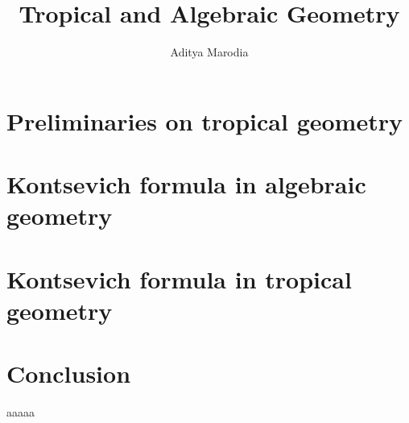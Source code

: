 \documentclass{iiser-thesis}
\title{Tropical and Algebraic Geometry}
\author{Aditya Marodia}
\theoremstyle{definition}
\theoremstyle{plain}
\begin{document}
\thesisfront


\chapter{Preliminaries on tropical geometry}
\label{chap:sturmfels}


%

\chapter{Kontsevich formula in algebraic geometry}
\label{chap:kontalggeom}


\chapter{Kontsevich formula in tropical geometry}
\label{chap:kottropgeom}

\chapter{Conclusion}
\label{chap:conclusion}
aaaaa


\end{document}

